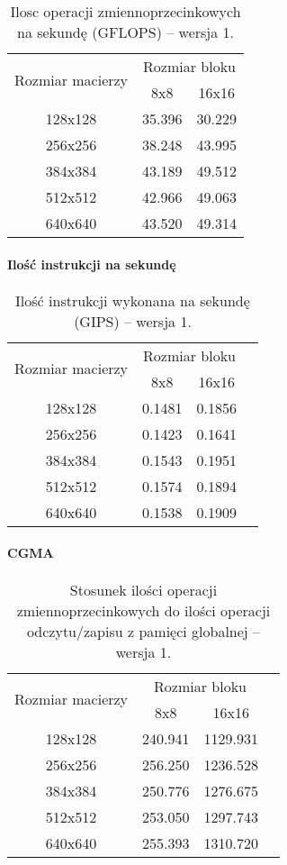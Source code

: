 \begin{table}[H]
\centering
\begin{tabular}{|c|c|c|}
\hline
\multirow{2}{*}{Rozmiar macierzy} & \multicolumn{2}{c|}{Rozmiar bloku} \\ \cline{2-3}
& 8x8 & 16x16 \\ \hline
128x128 & 35.396 & 30.229 \\ \hline
256x256 & 38.248 & 43.995 \\ \hline
384x384 & 43.189 & 49.512 \\ \hline
512x512 & 42.966 & 49.063 \\ \hline
640x640 & 43.520 & 49.314 \\ \hline
\end{tabular}
\caption{Ilosc operacji zmiennoprzecinkowych na sekundę (GFLOPS) -- wersja 1.}
\end{table}

\paragraph{Ilość instrukcji na sekundę}

\begin{table}[H]
\centering
\begin{tabular}{|c|c|c|c|}
\hline
\multirow{2}{*}{Rozmiar macierzy} & \multicolumn{2}{c|}{Rozmiar bloku} \\ \cline{2-3}
& 8x8 & 16x16 \\ \hline
128x128 & 0.1481 & 0.1856 \\ \hline
256x256 & 0.1423 & 0.1641 \\ \hline
384x384 & 0.1543 & 0.1951 \\ \hline
512x512 & 0.1574 & 0.1894 \\ \hline
640x640 & 0.1538 & 0.1909 \\ \hline
\end{tabular}
\caption{Ilość instrukcji wykonana na sekundę (GIPS) -- wersja 1.}
\end{table}

\paragraph{CGMA}

\begin{table}[H]
\centering
\begin{tabular}{|c|c|c|c|}
\hline
\multirow{2}{*}{Rozmiar macierzy} & \multicolumn{2}{c|}{Rozmiar bloku} \\ \cline{2-3}
& 8x8 & 16x16 \\ \hline
128x128 & 240.941 & 1129.931 \\ \hline
256x256 & 256.250 & 1236.528 \\ \hline
384x384 & 250.776 & 1276.675 \\ \hline
512x512 & 253.050 & 1297.743 \\ \hline
640x640 & 255.393 & 1310.720 \\ \hline
\end{tabular}
\caption{Stosunek ilości operacji zmiennoprzecinkowych do ilości operacji odczytu/zapisu z pamięci globalnej -- wersja 1.}
\end{table}

